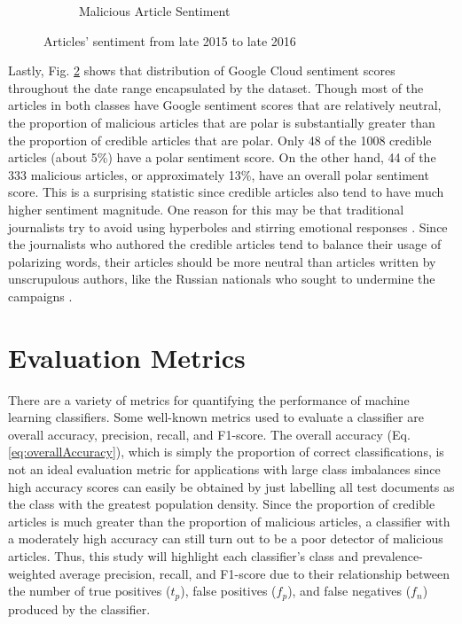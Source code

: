 \begin{figure}
\begin{subfigure}[h]{0.5\textwidth}
            \caption{Malicious Article Sentiment}
            \label{fig:maliciousSentimentThruYear}
    \end{subfigure}\hfill
    \caption[Article Sentiment Through Time]{
        Articles' sentiment from late 2015 to late 2016
    }
\label{fig:sentimentThruYear}
\end{figure}


Lastly, Fig. \ref{fig:sentimentThruYear} shows that distribution of Google Cloud sentiment scores throughout the date range encapsulated by the dataset.  Though most of the articles in both classes have Google sentiment scores that are relatively neutral, the proportion of malicious articles that are polar is substantially greater than the proportion of credible articles that are polar.  Only 48 of the 1008 credible articles (about 5\%) have a polar sentiment score.  On the other hand, 44 of the 333 malicious articles, or approximately 13\%, have an overall polar sentiment score.  This is a surprising statistic since credible articles also tend to have much higher sentiment magnitude.  One reason for this may be that traditional journalists try to avoid using hyperboles and stirring emotional responses \cite{opensources}.  Since the journalists who authored the credible articles tend to balance their usage of polarizing words, their articles should be more neutral than articles written by unscrupulous authors, like the Russian nationals who sought to undermine the campaigns \cite{russianBots}.

\section{Evaluation Metrics} \label{evaluationMetricsSection}

There are a variety of metrics for quantifying the performance of machine learning classifiers.  Some well-known metrics used to evaluate a classifier are overall accuracy,  precision, recall, and F1-score.  The overall accuracy (Eq. \ref{eq:overallAccuracy}), which is simply the proportion of correct classifications, is not an ideal evaluation metric for applications with large class imbalances since high accuracy scores can easily be obtained by just labelling all test documents as the class with the greatest population density.  Since the proportion of credible articles is much greater than the proportion of malicious articles, a classifier with a moderately high accuracy can still turn out to be a poor detector of malicious articles.  Thus, this study will highlight each classifier's class and prevalence-weighted average precision, recall, and F1-score due to their relationship between the number of true positives ($t_{p}$), false positives ($f_{p}$), and false negatives ($f_{n}$) produced by the classifier\cite{pythonMetrics}.

